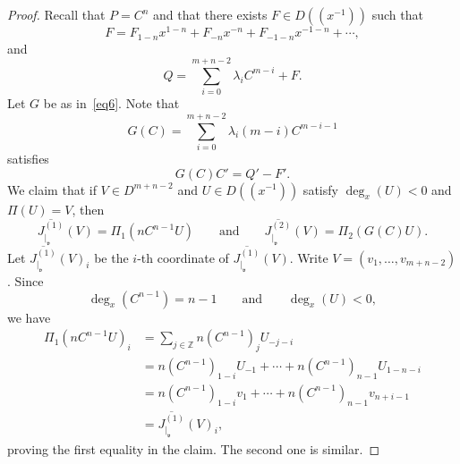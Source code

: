 \documentclass[reqno,a4paper]{amsart}
\theoremstyle{definition}
\theoremstyle{remark}
\newcommand{\ov}{\overline}
\begin{document}
\begin{proof} Recall that $P = C^n$ and that there exists $F\in D((x^{-1}))$ such that
\begin{equation}\label{formula de F}
F = F_{1-n} x^{1-n} + F_{-n} x^{-n} + F_{-1-n} x^{-1-n} +\cdots,
\end{equation}
and
$$
Q = \sum_{i=0}^{m+n-2}\lambda_i C^{m-i}+F.
$$
Let $G$ be as in~\eqref{eq6}. Note that
$$
G(C) = \sum_{i=0}^{m+n-2}\lambda_i (m-i) C^{m-i-1}
$$
satisfies
\begin{equation}
G(C)C' = Q'-F'.\label{eq14}
\end{equation}
We claim that if $V\in D^{m+n-2}$ and $U\in D((x^{-1}))$ satisfy $\deg_x(U)<0$ and $\Pi(U)=V$, then
\begin{equation}
\ov{J^{(1)}_{|_{\mathfrak{v}}}}(V) = \Pi_1(nC^{n-1} U)\qquad\text{and}\qquad
\ov{J^{(2)}_{|_{\mathfrak{v}}}}(V)=\Pi_2(G(C)U).\label{eq15}
\end{equation}
Let $\ov{J^{(1)}_{|_{\mathfrak{v}}}}(V)_i$ be the $i$-th coordinate of $\ov{J^{(1)}_{|_{\mathfrak{v}}}}(V)$.
Write $V = (v_1,\dots,v_{m+n-2})$. Since
$$
\deg_x(C^{n-1}) = n-1\qquad\text{and}\qquad \deg_x(U)< 0,
$$
we have
\begin{align*}
\Pi_1(nC^{n-1} U)_i & =  \sum_{j\in \mathds{Z}} n(C^{n-1})_j U_{-j-i}\\
%
& = n(C^{n-1})_{1-i} U_{-1} + \cdots + n(C^{n-1})_{n-1} U_{1-n-i}\\
%
& = n(C^{n-1})_{1-i} v_1 + \cdots + n(C^{n-1})_{n-1} v_{n+i-1}\\
%
& = \ov{J^{(1)}_{|_{\mathfrak{v}}}}(V)_i,
\end{align*}
proving the first equality in the claim. The second one is similar.

\smallskip


\end{proof}
\end{document}

